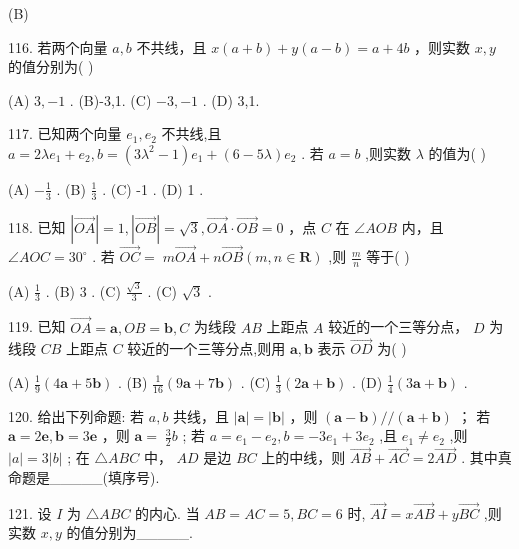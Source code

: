 \documentclass[10pt]{article}
\newcommand*\circled[1]{\tikz[baseline=(char.base)]{\node[shape=circle,draw,inner sep=1.5pt] (char) {\small #1};}}
\begin{document}
(B)

116. 若两个向量 \(a,b\) 不共线，且 \(x\left( {a + b}\right)  + y\left( {a - b}\right)  = a + {4b}\) ，则实数 \(x,y\) 的值分别为( )

(A) \(3, - 1\) . (B)-3,1. (C) \(- 3, - 1\) . (D) 3,1.

117. 已知两个向量 \({e}_{1},{e}_{2}\) 不共线,且 \(a = {2\lambda }{e}_{1} + {e}_{2},b = \left( {3{\lambda }^{2} - 1}\right) {e}_{1} + \left( {6 - {5\lambda }}\right) {e}_{2}\) . 若 \(a = b\) ,则实数 \(\lambda\) 的值为( )

(A) \(- \frac{1}{3}\) . (B) \(\frac{1}{3}\) . (C) -1 . (D) 1 .

118. 已知 \(\left| \overrightarrow{OA}\right|  = 1,\left| \overrightarrow{OB}\right|  = \sqrt{3},\overrightarrow{OA} \cdot  \overrightarrow{OB} = 0\) ，点 \(C\) 在 \(\angle {AOB}\) 内，且 \(\angle {AOC} = {30}^{ \circ  }\) . 若 \(\overrightarrow{OC} = \; m\overrightarrow{OA} + n\overrightarrow{OB}\left( {m,n \in  \mathbf{R}}\right)\) ,则 \(\frac{m}{n}\) 等于( )

(A) \(\frac{1}{3}\) . (B) 3 . (C) \(\frac{\sqrt{3}}{3}\) . (C) \(\sqrt{3}\) .

119. 已知 \(\overrightarrow{OA} = \mathbf{a},{OB} = \mathbf{b},C\) 为线段 \({AB}\) 上距点 \(A\) 较近的一个三等分点， \(D\) 为线段 \({CB}\) 上距点 \(C\) 较近的一个三等分点,则用 \(\mathbf{a},\mathbf{b}\) 表示 \(\overrightarrow{OD}\) 为( )

(A) \(\frac{1}{9}\left( {4\mathbf{a} + 5\mathbf{b}}\right)\) . (B) \(\frac{1}{16}\left( {9\mathbf{a} + 7\mathbf{b}}\right)\) . (C) \(\frac{1}{3}\left( {2\mathbf{a} + \mathbf{b}}\right)\) . (D) \(\frac{1}{4}\left( {3\mathbf{a} + \mathbf{b}}\right)\) .

120. 给出下列命题: \circled{1} 若 \(a,b\) 共线，且 \(\left| \mathbf{a}\right|  = \left| \mathbf{b}\right|\) ，则 \(\left( {\mathbf{a} - \mathbf{b}}\right) //\left( {\mathbf{a} + \mathbf{b}}\right)\) ； \circled{2} 若 \(\mathbf{a} = {2\mathbf{e}},\mathbf{b} = {3\mathbf{e}}\) ，则 \(\mathbf{a} = \; \frac{3}{2}b\) ;  \circled{3} 若 \(a = {e}_{1} - {e}_{2},b =  - 3{e}_{1} + 3{e}_{2}\) ,且 \({e}_{1} \neq  {e}_{2}\) ,则 \(\left| a\right|  = 3\left| b\right|\) ;  \circled{4} 在 \(\bigtriangleup {ABC}\) 中， \({AD}\) 是边 \({BC}\) 上的中线，则 \(\overrightarrow{AB} + \overrightarrow{AC} = 2\overrightarrow{AD}\) . 其中真命题是\_\_\_\_\_(填序号).

121. 设 \(I\) 为 \(\bigtriangleup {ABC}\) 的内心. 当 \({AB} = {AC} = 5,{BC} = 6\) 时, \(\overrightarrow{AI} = x\overrightarrow{AB} + y\overrightarrow{BC}\) ,则实数 \(x,y\) 的值分别为\_\_\_\_\_.
\end{document}
